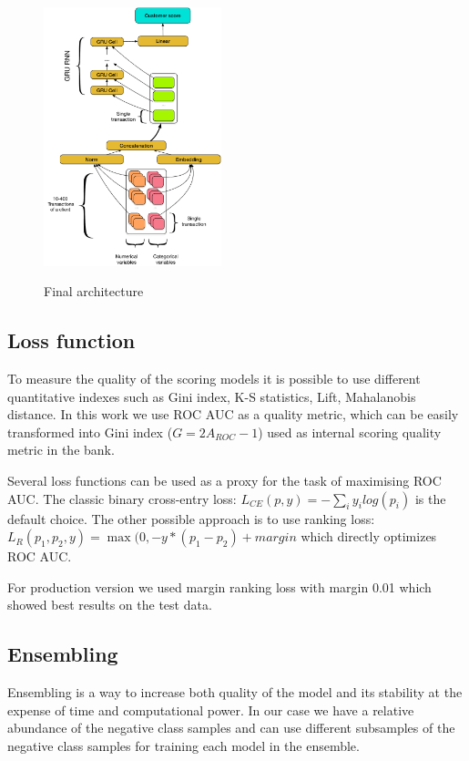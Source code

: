\documentclass{sigkddExp}
\begin{document}
\begin{figure}
  \caption{Final architecture}
  \includegraphics[width=0.46\textwidth]{architecture.pdf}
  \label{fig-arch}
\end{figure}


\subsection{Loss function}

To measure the quality of the scoring models it is possible to use different quantitative indexes such as Gini index, K-S statistics, Lift, Mahalanobis distance. 
In this work we use ROC AUC as a quality metric, which can be easily transformed into Gini index ($G = 2A_{ROC} - 1$) used as internal scoring quality metric in the bank. 

Several loss functions can be used as a proxy for the task of maximising ROC AUC. The classic binary cross-entry loss: $L_{CE}(p, y) = - \sum_i y_ilog(p_i)$ is the default choice.
The other possible approach is to use ranking loss: $ L_R(p_1, p_2, y) = \max(0, -y * (p_1 - p_2) + margin $ which directly optimizes ROC AUC.

For production version we used margin ranking loss with margin 0.01 which showed best results on the test data. 

\subsection{Ensembling}

Ensembling is a way to increase both quality of the model and its stability at the expense of time and computational power. In our case we have a relative abundance of the negative class samples and can use different subsamples of the negative class samples for training each model in the ensemble. 
\end{document}
